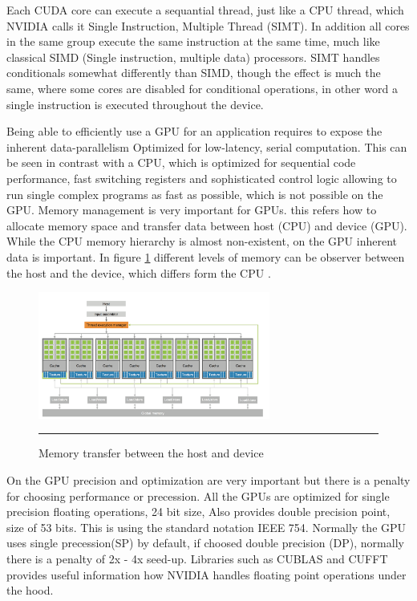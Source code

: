 Each CUDA core  can execute a sequantial thread, just like a CPU thread, which NVIDIA calls it Single Instruction, Multiple Thread (SIMT). In addition all cores in the same group execute the same instruction at the same time, much like classical SIMD (Single instruction, multiple data) processors. SIMT handles conditionals somewhat differently than SIMD, though the effect is much the same, where some cores are disabled for conditional operations, in other word a single instruction is executed throughout the device.

Being able to efficiently use a GPU for an application requires to expose the inherent data-parallelism Optimized for low-latency, serial computation. This can be seen in contrast with a CPU, which is optimized for sequential code performance, fast switching registers  and sophisticated control logic allowing to run single complex programs as fast as possible, which is not possible on the GPU. Memory management is very important for GPUs. this refers how to allocate memory space and transfer data between host (CPU) and device (GPU). While the CPU memory hierarchy is almost non-existent, on the GPU inherent data is important. In figure \ref{fig:arch} different levels of memory can be observer between the host and the device, which differs form the CPU \cite{hwu}.

\begin{figure}[htbp]
	\centering
		\includegraphics[width=0.68\textwidth]{Figures/arch.png}
		\rule{35em}{0.5pt}
	\caption[Host and Device]{Memory transfer between the host and device}
	\label{fig:arch}
\end{figure}


On the GPU precision and optimization are very important but there is a penalty for choosing performance or precession. All the GPUs are optimized for single precision floating operations, 24 bit size, Also provides double precision point, size of  53 bits. This is using the standard notation IEEE 754. Normally the GPU uses single precession(SP) by default, if choosed double precision (DP), normally there is a penalty of  2x - 4x seed-up. \cite{precision}
Libraries such as CUBLAS and CUFFT provides useful information how NVIDIA handles floating point operations under the hood.



